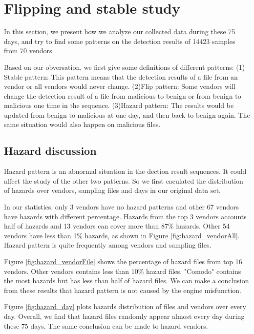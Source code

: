 \section{Flipping and stable study}

In this section, we present how we analyze our collected data during these 75 days, and try to find some patterns on the detection results of 14423 samples from 70 vendors. 

Based on our obversation, we first give some definitions of different patterns: (1) Stable pattern: This pattern means that the detection results of a file from an vendor or all vendors would never change. (2)Flip pattern: Some vendors will change the detection result of a file from malicious to benign or from benign to malicious one time in the sequence. (3)Hazard pattern: The results would be updated from benign to malicious at one day, and then back to benign again. The same situation would also happen on malicious files. 


\subsection{Hazard discussion}



Hazard pattern is an abnormal situation in the dection result sequences. It could affect the study of the other two patterns. So we first caculated the distribution of hazards over vendors, sampling files and days in our original data set.

In our statistics, only 3 vendors have no hazard patterns and other 67 vendors have hazards with different percentage. Hazards from the top 3 vendors accounts half of hazards and 13 vendors can cover more than 87\% hazards. Other 54 vendors have less than 1\% hazards, as shown in Figure \ref{fig:hazard_vendorAll}. Hazard pattern is quite frequently among vendors and sampling files.

Figure \ref{fig:hazard_vendorFile} shows the percentage of hazard files from top 16 vendors. Other vendors contains less than 10\% hazard files. "Comodo" contains the most hazards but has less than half of hazard files. We can make a conclusion from these results that hazard pattern is not caused by the engine misfunction. 

Figure \ref{fig:hazard_day} plots hazards distribution of files and vendors over every day. Overall, we find that hazard files randomly appear almost every day during these 75 days. The same conclusion can be made to hazard vendors. 


